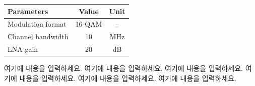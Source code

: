 \begin{table}[t]
\centering
{}
\label{tab:example}
\begin{tabular}{lcc}
\toprule
Parameters & Value & Unit \\
\midrule
Modulation format   & 16-QAM & --  \\
Channel bandwidth   & 10     & MHz \\
LNA gain            & 20     & dB  \\
\bottomrule
\end{tabular}
\end{table}

여기에 내용을 입력하세요. 여기에 내용을 입력하세요. 여기에 내용을 입력하세요.
여기에 내용을 입력하세요. 여기에 내용을 입력하세요. 여기에 내용을 입력하세요.
